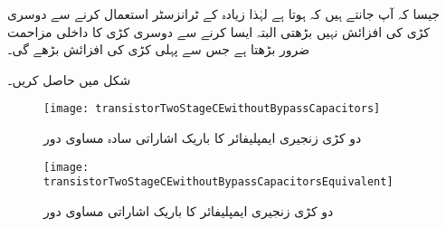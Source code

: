 جیسا کہ آپ جانتے ہیں کہ  ہوتا ہے لہٰذا زیادہ  کے ٹرانزسٹر استعمال کرنے سے دوسری کڑی کی افزائش نہیں بڑھتی البتہ ایسا کرنے سے دوسری کڑی کا داخلی مزاحمت ضرور بڑھتا ہے جس سے پہلی کڑی کی افزائش بڑھے گی۔

شکل  میں  حاصل کریں۔
\begin{figure}
\centering
\texttt{[image: transistorTwoStageCEwithoutBypassCapacitors]}
\caption{دو کڑی زنجیری ایمپلیفائر کا باریک اشاراتی سادہ مساوی دور}
\label{شکل_دو_کڑی_زنجیری_ایمپلیفائر_بغیر_گزر_کپیسٹر}
\end{figure}
%
\begin{figure}
\centering
\texttt{[image: transistorTwoStageCEwithoutBypassCapacitorsEquivalent]}
\caption{دو کڑی زنجیری ایمپلیفائر کا باریک اشاراتی مساوی دور}
\label{شکل_دو_کڑی_زنجیری_ایمپلیفائر_بغیر_گزر_کپیسٹر_کا_مساوی}
\end{figure}

